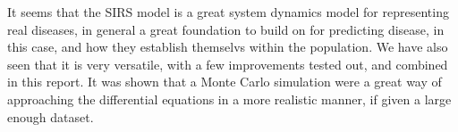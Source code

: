 



It seems that the SIRS model is a great system dynamics model for representing real diseases, in general a great foundation to build on for predicting disease, in this case, and how they establish themselvs within the population. We have also seen that it is very versatile, with a few improvements tested out, and combined in this report. It was shown that a Monte Carlo simulation were a great way of approaching the differential equations in a more realistic manner, if given a large enough dataset. 
